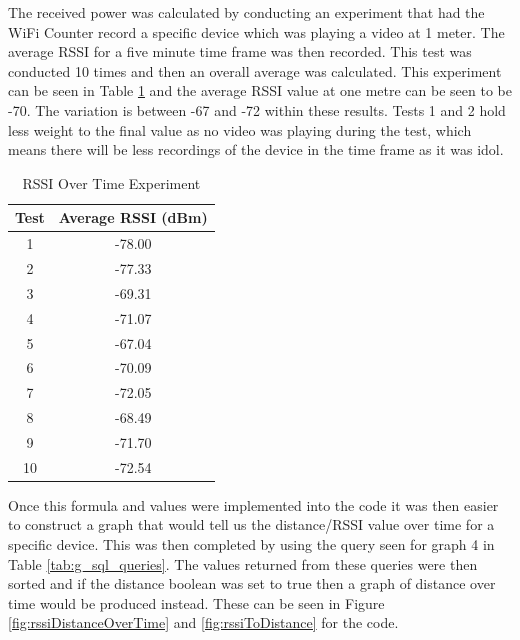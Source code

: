 \documentclass{report}
\begin{document}
The received power was calculated by conducting an experiment that had the WiFi Counter record a specific device which was playing a video at 1 meter. The average RSSI for a five minute time frame was then recorded. This test was conducted 10 times and then an overall average was calculated. This experiment can be seen in Table \ref{tab:RSSIoverTime} and the average RSSI value at one metre can be seen to be -70. The variation is between -67 and -72 within these results. Tests 1 and 2 hold less weight to the final value as no video was playing during the test, which means there will be less recordings of the device in the time frame as it was idol.\\ 
\begin{table}[h!]
    \centering
    \begin{tabular}{|c|c|}
    \hline
         Test & Average RSSI (dBm)\\
    \hline
        1 & -78.00 \\
        2 & -77.33 \\
        3 & -69.31 \\
        4 & -71.07 \\
        5 & -67.04 \\
        6 & -70.09 \\
        7 & -72.05 \\
        8 & -68.49 \\
        9 & -71.70 \\
        10 & -72.54 \\
    \hline
    \end{tabular}
    \caption{RSSI Over Time Experiment}
    \label{tab:RSSIoverTime}
\end{table} \newline
Once this formula and values were implemented into the code it was then easier to construct a graph that would tell us the distance/RSSI value over time for a specific device. This was then completed by using the query seen for graph 4 in Table \ref{tab:g_sql_queries}. The values returned from these queries were then sorted and if the distance boolean was set to true then a graph of distance over time would be produced instead. These can be seen in Figure \ref{fig:rssiDistanceOverTime} and \ref{fig:rssiToDistance} for the code. \\ \newline
\clearpage
\end{document}
